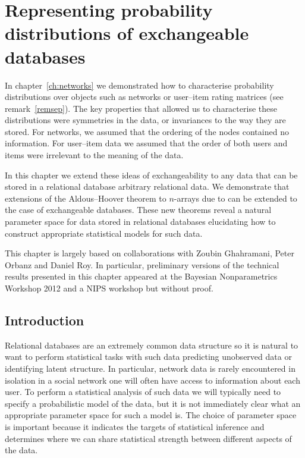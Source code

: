 
\inbpdocument

\chapter{Representing probability distributions of exchangeable databases}
\label{ch:arrays}

In chapter~\ref{ch:networks} we demonstrated how to characterise probability distributions over objects such as networks or user--item rating matrices (see remark~\ref{remsep}).
The key properties that allowed us to characterise these distributions were symmetries in the data, or invariances to the way they are stored.
For networks, we assumed that the ordering of the nodes contained no information.
For user--item data we assumed that the order of both users and items were irrelevant to the meaning of the data.

In this chapter we extend these ideas of exchangeability to any data that can be stored in a relational database \ie arbitrary relational data.
We demonstrate that extensions of the Aldous--Hoover theorem to $n$-arrays due to \citet{Kallenberg1999-pj} can be extended to the case of exchangeable databases.
These new theorems reveal a natural parameter space for data stored in relational databases elucidating how to construct appropriate statistical models for such data.

This chapter is largely based on collaborations with Zoubin Ghahramani, Peter Orbanz and Daniel Roy.
In particular, preliminary versions of the technical results presented in this chapter appeared at the Bayesian Nonparametrics Workshop 2012 and a NIPS workshop \citep{Lloyd_undated-iu} but without proof.

\section{Introduction}

Relational databases are an extremely common data structure so it is natural to want to perform statistical tasks with such data \eg predicting unobserved data or identifying latent structure.
In particular, network data is rarely encountered in isolation \eg in a social network one will often have access to information about each user.
To perform a statistical analysis of such data we will typically need to specify a probabilistic model of the data, but it is not immediately clear what an appropriate parameter space for such a model is.
The choice of parameter space is important because it indicates the targets of statistical inference and determines where we can share statistical strength between different aspects of the data.

